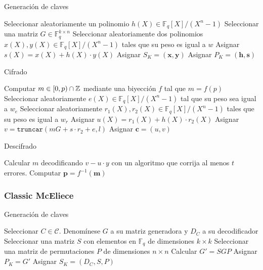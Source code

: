 \autocite{HQC}

\begin{algorithm}
	\caption{Generación de claves}\label{alg:1}
	Seleccionar aleatoriamente un polinomio $h(X) \in \mathbb{F}_q[X] / (X^n - 1)$\;
	Seleccionar una matriz $G \in \mathbb{F}_q^{k \times n}$\;
	Seleccionar aleatoriamente dos polinomios $x(X), y(X) \in \mathbb{F}_q[X] / (X^n - 1)$ tales que su peso es igual a $w$\;
	Asignar $s(X) = x(X) + h(X) \cdot y(X)$\;
	Asignar $S_K = (\textbf{x}, \textbf{y})$\;
	Asignar $P_K = (\textbf{h}, \textbf{s})$\;
\end{algorithm}

\begin{algorithm}
	\caption{Cifrado}\label{alg:1}
	Computar $m \in [0, p) \cap \mathbb{Z}$ mediante una biyección $f$ tal que $m = f(p)$\;
	Seleccionar aleatoriamente $e(X) \in \mathbb{F}_q[X] / (X^n - 1)$ tal que su peso sea igual a $w_e$\;
	Seleccionar aleatoriamente $r_1(X), r_2(X) \in \mathbb{F}_q[X] / (X^n - 1)$ tales que su peso es igual a $w_r$\;
	Asignar $u(X) = r_1(X) + h(X) \cdot r_2(X)$\;
	Asignar $v = \mathtt{truncar}(mG + s \cdot r_2 + e, l)$\;
	Asignar $\textbf{c} = (u, v)$\;
\end{algorithm}

\begin{algorithm}
	\caption{Descifrado}\label{alg:1}
	Calcular $m$ decodificando $v - u \cdot y$ con un algoritmo que corrija al menos $t$ errores.
	Computar $\textbf{p} = f^{-1}(\textbf{m})$\; 
\end{algorithm}

\subsubsection{Classic McEliece}

\autocite{McEliece}

\begin{algorithm}
	\caption{Generación de claves}\label{alg:1}
	Seleccionar $C \in \mathcal{C}$. Denomínese $G$ a su matriz generadora y $D_C$ a su decodificador\;
	Seleccionar una matriz $S$ con elementos en $\mathbb{F}_q$ de dimensiones $k \times k$\;
	Seleccionar una matriz de permutaciones $P$ de dimensiones $n \times n$\;
	Calcular $G' = SGP$\;
	Asignar $P_K = G'$\;
	Asignar $S_K = (D_C, S, P)$\;
\end{algorithm}

